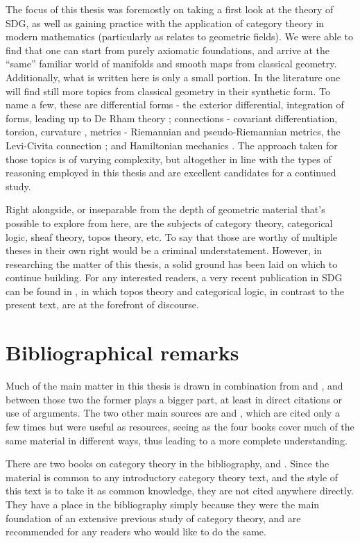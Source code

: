 The focus of this thesis was foremostly on taking a first look at the theory of SDG, as well as gaining practice with the application of category theory in modern mathematics (particularly as relates to geometric fields). We were able to find that one can start from purely axiomatic foundations, and arrive at the ``same'' familiar world of manifolds and smooth maps from classical geometry. Additionally, what is written here is only a small portion. In the literature one will find still more topics from classical geometry in their synthetic form. To name a few, these are differential forms - the exterior differential, integration of forms, leading up to De Rham theory \cite{lav96}; connections - covariant differentiation, torsion, curvature \cite{lav96}, metrics - Riemannian and pseudo-Riemannian metrics, the Levi-Civita connection \cite{kock10}; and Hamiltonian mechanics \cite{lav96, nish96}. The approach taken for those topics is of varying complexity, but altogether in line with the types of reasoning employed in this thesis and are excellent candidates for a continued study.

Right alongside, or inseparable from the depth of geometric material that's possible to explore from here, are the subjects of category theory, categorical logic, sheaf theory, topos theory, etc. To say that those are worthy of multiple theses in their own right would be a criminal understatement. However, in researching the matter of this thesis, a solid ground has been laid on which to continue building. For any interested readers, a very recent publication in SDG can be found in \cite{bun17}, in which topos theory and categorical logic, in contrast to the present text, are at the forefront of discourse.

\section*{Bibliographical remarks}

Much of the main matter in this thesis is drawn in combination from \cite{kock06} and \cite{lav96}, and between those two the former plays a bigger part, at least in direct citations or use of arguments. The two other main sources are \cite{bun17} and \cite{kock10}, which are cited only a few times but were useful as resources, seeing as the four books cover much of the same material in different ways, thus leading to a more complete understanding.

There are two books on category theory in the bibliography, \cite{lei16} and \cite{sml71}. Since the material is common to any introductory category theory text, and the style of this text is to take it as common knowledge, they are not cited anywhere directly. They have a place in the bibliography simply because they were the main foundation of an extensive previous study of category theory, and are recommended for any readers who would like to do the same.

